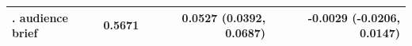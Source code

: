 \begin{tabular}{p{4.6cm}rrr}
\quad 7. audience brief & 0.5671 & 0.0527 (0.0392, 0.0687) & -0.0029 (-0.0206, 0.0147) \\
\bottomrule
\end{tabular}

